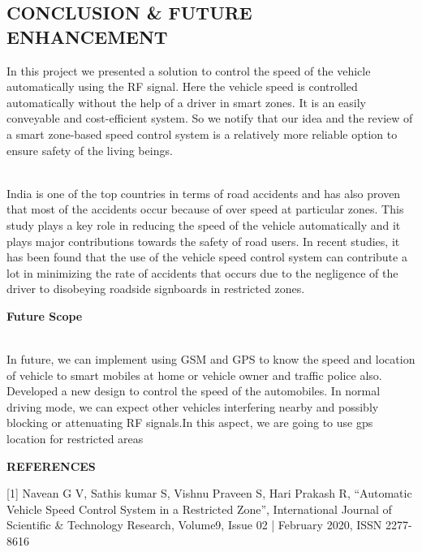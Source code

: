 \documentclass[a4paper,12pt, English]{article}
\newcommand\tab[1][1cm]{\hspace*{#1}}
\begin{document}
\begin{normalsize}
{\begin{center}
\section{ \Large  CONCLUSION \& FUTURE ENHANCEMENT}
\end{center}

In this project we presented a solution to control the speed of the
vehicle automatically using the RF signal. Here the vehicle
speed is controlled automatically without the help of a driver
in smart zones.
It is an easily conveyable and cost-efficient system.
So we notify that our idea and the review of a smart zone-based speed  control system is a relatively more reliable option to ensure safety of the  living beings.

\\
India is one of the top countries in terms of road accidents and has also proven that most of the accidents occur because of over speed at particular zones. 
This study plays a key role in reducing the speed of the vehicle automatically and it plays major contributions towards the safety of road users. In recent studies, it has been found that the use of the vehicle speed control system can contribute a lot in minimizing the rate of accidents that occurs due to the negligence of the driver to disobeying roadside signboards in restricted zones. 
\newpage
\begin{large}
\textbf{ Future Scope}
\end{large}
\\
In future, we can implement using GSM and GPS to
know the speed and location of vehicle to smart mobiles at
home or vehicle owner and traffic police also. 
Developed a new design to control the speed of the automobiles. In normal driving mode, we can expect other vehicles interfering nearby and possibly blocking or attenuating RF signals.In this aspect, we are going to use gps location for restricted areas

\newpage
{
\begin{center}
\begin{large}
\textbf{\tab REFERENCES}
\end{large}
\end{center}
}
\vspace*{0.08in}
\begin{normalsize}

[1] Navean G V, Sathis kumar S, Vishnu Praveen S, Hari Prakash R, “Automatic Vehicle Speed Control System in a Restricted Zone”, International Journal of Scientific & Technology Research, Volume9, Issue 02 | February 2020, ISSN 2277-8616 \\


\end{normalsize}}
\end{normalsize}
\end{document}
